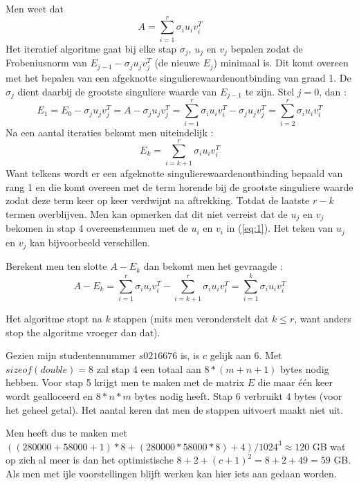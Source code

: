 

Men weet dat 
\begin{equation} \label{eq:1}
A=\sum_{i=1}^r \sigma_iu_iv_i^T \qquad
\end{equation}
Het iteratief algoritme gaat bij elke stap $\sigma_j$, $u_j$ en $v_j$ bepalen zodat de Frobeniusnorm van $E_{j-1}-\sigma_ju_jv_j^T$ (de nieuwe $E_j$) minimaal is. Dit komt overeen met het bepalen van een afgeknotte singulierewaardenontbinding van graad 1. De $\sigma_j$ dient daarbij de grootste singuliere waarde van $E_{j-1}$ te zijn. Stel $j = 0$, dan :
$$E_1=E_0-\sigma_ju_jv_j^T=A-\sigma_ju_jv_j^T=\sum_{i=1}^r \sigma_iu_iv_i^T-\sigma_ju_jv_j^T = \sum_{i=2}^{r} \sigma_iu_iv_i^T$$
Na een aantal iteraties bekomt men uiteindelijk :
$$E_k=\sum_{i=k+1}^{r} \sigma_iu_iv_i^T$$
Want telkens wordt er een afgeknotte singulierewaardenontbinding bepaald van rang 1 en die komt overeen met de term horende bij de grootste singuliere waarde zodat deze term keer op keer verdwijnt na aftrekking. Totdat de laatste $r-k$ termen overblijven. 
Men kan opmerken dat dit niet verreist dat de $u_j$ en $v_j$ bekomen in stap 4 overeenstemmen met de $u_i$ en $v_i$ in (\ref{eq:1}). Het teken van $u_j$ en $v_j$ kan bijvoorbeeld verschillen.\\
\par\noindent Berekent men ten slotte $A-E_k$ dan bekomt men het gevraagde :
$$A-E_k = \sum_{i=1}^{r} \sigma_iu_iv_i^T-\sum_{i=k+1}^{r} \sigma_iu_iv_i^T=\sum_{i=1}^{k} \sigma_iu_iv_i^T$$

\noindent Het algoritme stopt na $k$ stappen (mits men veronderstelt dat $k\leq r$, want anders stop the algoritme vroeger dan dat).



Gezien mijn studentennummer $s0216676$ is, is $c$ gelijk aan $6$. Met $sizeof(double)=8$ zal stap 4 een totaal aan $8*(m+n+1)$ bytes nodig hebben. Voor stap 5 krijgt men te maken met de matrix $E$ die maar \'e\'en keer wordt gealloceerd en $8*n*m$ bytes nodig heeft. Stap 6 verbruikt $4$ bytes (voor het geheel getal). Het aantal keren dat men de stappen uitvoert maakt niet uit.\\

\par\noindent Men heeft dus te maken met $((280000+58000+1)*8+(280000*58000*8)+4)/1024^3\approx 120$ GB wat op zich al meer is dan het optimistische $8+2+(c+1)^2=8+2+49=59$ GB.  Als men met ijle voorstellingen blijft werken kan hier iets aan gedaan worden.

